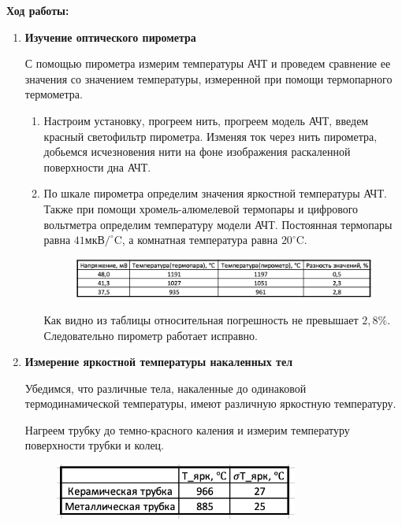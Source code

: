 \documentclass[a4paper, 12pt]{article}%
\begin{document}
\textbf{Ход работы:}

\begin{enumerate}

\item \textbf{Изучение оптического пирометра}

С помощью пирометра измерим температуры АЧТ и проведем сравнение ее значения со значением температуры,  измеренной при помощи термопарного термометра.

\begin{enumerate}

\item Настроим установку,  прогреем нить,  прогреем модель АЧТ,  введем красный светофильтр пирометра.  Изменяя ток через нить пирометра,  добьемся исчезновения нити на фоне изображения раскаленной поверхности дна АЧТ.

\item По шкале пирометра определим значения яркостной температуры АЧТ.  Также при помощи хромель-алюмелевой термопары и цифрового вольтметра определим температуру модели АЧТ.  Постоянная термопары равна $41\text{мкВ}/^\circ$C,  а комнатная температура равна $20^\circ$C.

\begin{figure}[ht]
    \centering
    \includegraphics[width=13cm]{Таблица1.PNG}
\end{figure}

Как видно из таблицы относительная погрешность не превышает $2,8 \%$.  Следовательно пирометр работает исправно.

\end{enumerate}

\item \textbf{Измерение яркостной температуры накаленных тел}

Убедимся,  что различные тела,  накаленные до одинаковой термодинамической температуры,  имеют различную яркостную температуру.

Нагреем трубку до темно-красного каления и измерим температуру поверхности трубки и колец.

\begin{figure}[ht]
    \centering
    \includegraphics[width=8cm]{Таблица2.PNG}
\end{figure}


\end{enumerate}
\end{document}

